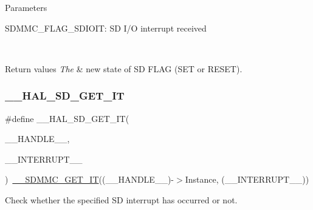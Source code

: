 \begin{DoxyParams}{Parameters}
\begin{DoxyItemize}
S\+D\+M\+M\+C\+\_\+\+F\+L\+A\+G\+\_\+\+S\+D\+I\+O\+IT\+: SD I/O interrupt received \end{DoxyItemize}
\\
\hline
\end{DoxyParams}

\begin{DoxyRetVals}{Return values}
{\em The} & new state of SD F\+L\+AG (S\+ET or R\+E\+S\+ET). \\
\hline
\end{DoxyRetVals}
\mbox{\label{group___s_d___exported__macros_gaa190cebf2592d90787e0d1792aa44a46}} 
\subsubsection{\texorpdfstring{\_\_HAL\_SD\_GET\_IT}{\_\_HAL\_SD\_GET\_IT}}
{\footnotesize\ttfamily \#define \+\_\+\+\_\+\+H\+A\+L\+\_\+\+S\+D\+\_\+\+G\+E\+T\+\_\+\+IT(\begin{DoxyParamCaption}\item[{}]{\+\_\+\+\_\+\+H\+A\+N\+D\+L\+E\+\_\+\+\_\+,  }\item[{}]{\+\_\+\+\_\+\+I\+N\+T\+E\+R\+R\+U\+P\+T\+\_\+\+\_\+ }\end{DoxyParamCaption})~\mbox{\hyperlink{group___s_d_m_m_c___l_l___interrupt___clock_gaf2f7410908e86bd0a59f398f7a52ea1c}{\+\_\+\+\_\+\+S\+D\+M\+M\+C\+\_\+\+G\+E\+T\+\_\+\+IT}}((\+\_\+\+\_\+\+H\+A\+N\+D\+L\+E\+\_\+\+\_\+)-\/$>$Instance, (\+\_\+\+\_\+\+I\+N\+T\+E\+R\+R\+U\+P\+T\+\_\+\+\_\+))}



Check whether the specified SD interrupt has occurred or not. 


